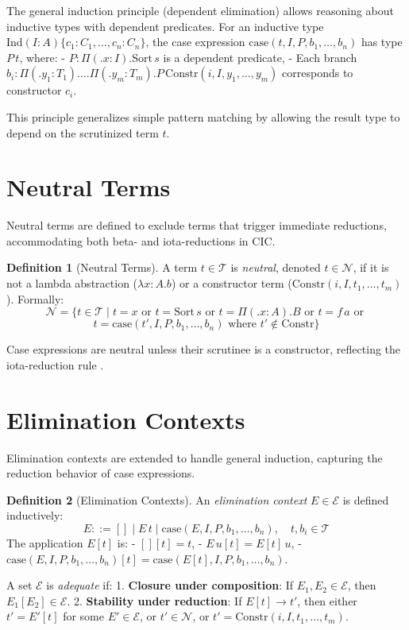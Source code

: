 \documentclass{article}
\theoremstyle{plain}
\theoremstyle{definition}
\newtheorem{definition}{Definition}[section]
\newcommand{\term}{\mathcal{T}}
\newcommand{\neut}{\mathcal{N}}
\newcommand{\elim}{\mathcal{E}}
\newcommand{\lam}[2]{\lambda #1 . #2}
\newcommand{\fib}[2]{\Pi #1 . #2}
\newcommand{\app}[2]{#1 \, #2}
\newcommand{\rewrite}{\to}
\newcommand{\ind}{\text{Ind}}
\newcommand{\constr}{\text{Constr}}
\newcommand{\case}{\text{case}}
\begin{document}
The general induction principle (dependent elimination) allows reasoning
about inductive types with dependent predicates. For an inductive
type \(\ind(I : A)\{c_1 : C_1, \dots, c_n : C_n\}\), the case
expression \(\case(t, I, P, b_1, \dots, b_n)\) has type \(\app{P}{t}\), where:
- \(P : \fib (x : I). \text{Sort} \, s\) is a dependent predicate,
- Each branch \(b_i : \fib (y_1 : T_1). \dots \fib (y_m : T_m).
  \app{P}{\constr(i, I, y_1, \dots, y_m)}\) corresponds to constructor \(c_i\).

This principle generalizes simple pattern matching by allowing the
result type to depend on the scrutinized term \(t\).

\section{Neutral Terms}

Neutral terms are defined to exclude terms that trigger immediate
reductions, accommodating both beta- and iota-reductions in CIC.

\begin{definition}[Neutral Terms]
A term \(t \in \term\) is \emph{neutral}, denoted \(t \in \neut\),
if it is not a lambda abstraction (\(\lam{x : A}{b}\)) or a constructor
term (\(\constr(i, I, t_1, \dots, t_m)\)). Formally:
\[
\neut = \{ t \in \term \mid t = x \text{ or } t = \text{Sort} \,
  s \text{ or } t = \fib (x : A). B \text{ or } t = \app{f}{a} \text{ or }
\]
\[
    t = \case(t', I, P, b_1, \dots, b_n) \text{ where } t' \notin \constr \}
\]

\end{definition}

Case expressions are neutral unless their scrutinee is a constructor,
reflecting the iota-reduction rule \cite{riba2008}.

\section{Elimination Contexts}

Elimination contexts are extended to handle general induction,
capturing the reduction behavior of case expressions.

\begin{definition}[Elimination Contexts]
An \emph{elimination context} \(E \in \elim\) is defined inductively:
\[
E ::= [] \mid \app{E}{t} \mid \case(E, I, P, b_1, \dots, b_n), \quad t, b_i \in \term
\]
The application \(E[t]\) is:
- \([] [t] = t\),
- \(\app{E}{u} [t] = \app{E[t]}{u}\),
- \(\case(E, I, P, b_1, \dots, b_n) [t] = \case(E[t], I, P, b_1, \dots, b_n)\).

A set \(\elim\) is \emph{adequate} if:
1. \textbf{Closure under composition}: If \(E_1, E_2 \in \elim\), then \(E_1[E_2] \in \elim\).
2. \textbf{Stability under reduction}: If \(E[t] \rewrite t'\), then either \(t' = E'[t]\) for some \(E' \in \elim\), or \(t' \in \neut\), or \(t' = \constr(i, I, t_1, \dots, t_m)\).
\end{definition}
\end{document}
